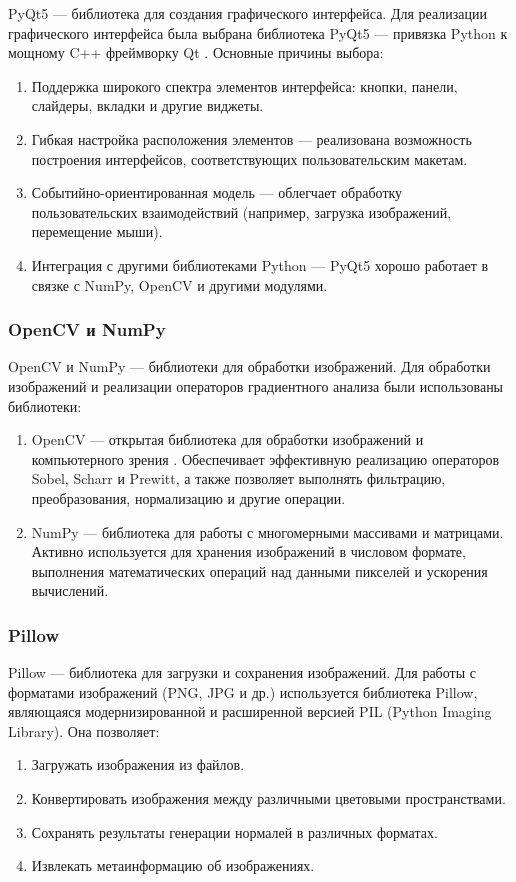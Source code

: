 PyQt5 — библиотека для создания графического интерфейса. Для реализации графического интерфейса была выбрана библиотека PyQt5 — привязка Python к мощному C++ фреймворку Qt \cite{talipov2020}. Основные причины выбора:
\begin{enumerate}
	\item Поддержка широкого спектра элементов интерфейса: кнопки, панели, слайдеры, вкладки и другие виджеты.
	\item Гибкая настройка расположения элементов — реализована возможность построения интерфейсов, соответствующих пользовательским макетам.
	\item Событийно-ориентированная модель — облегчает обработку пользовательских взаимодействий (например, загрузка изображений, перемещение мыши).
	\item Интеграция с другими библиотеками Python — PyQt5 хорошо работает в связке с NumPy, OpenCV и другими модулями.
\end{enumerate}
\subsubsection{OpenCV и NumPy}

OpenCV и NumPy — библиотеки для обработки изображений. Для обработки изображений и реализации операторов градиентного анализа были использованы библиотеки:
\begin{enumerate}
	\item OpenCV — открытая библиотека для обработки изображений и компьютерного зрения \cite{kaehler2021}. Обеспечивает эффективную реализацию операторов Sobel, Scharr и Prewitt, а также позволяет выполнять фильтрацию, преобразования, нормализацию и другие операции.
	\item NumPy — библиотека для работы с многомерными массивами и матрицами. Активно используется для хранения изображений в числовом формате, выполнения математических операций над данными пикселей и ускорения вычислений.
\end{enumerate}
\subsubsection{Pillow}

Pillow — библиотека для загрузки и сохранения изображений. Для работы с форматами изображений (PNG, JPG и др.) используется библиотека Pillow, являющаяся модернизированной и расширенной версией PIL (Python Imaging Library). Она позволяет:
\begin{enumerate}
	\item Загружать изображения из файлов.
	\item Конвертировать изображения между различными цветовыми пространствами.
	\item Сохранять результаты генерации нормалей в различных форматах.
	\item Извлекать метаинформацию об изображениях.
\end{enumerate}

